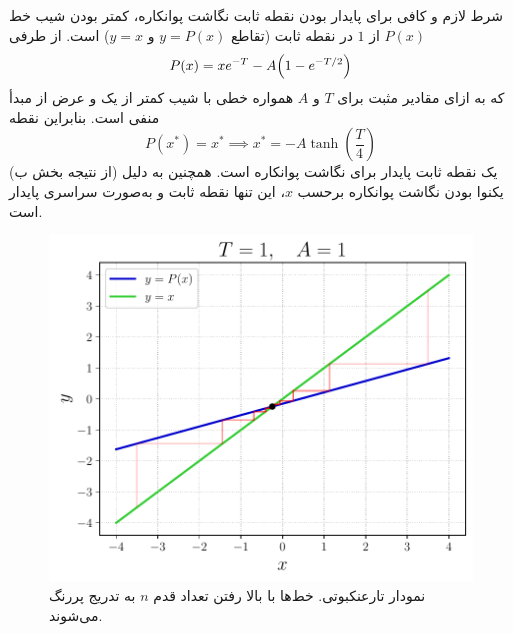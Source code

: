 \documentclass[12pt,a4paper]{article}
\begin{document}
	\subsection{}
	شرط لازم و کافی برای پایدار بودن نقطه ثابت نگاشت پوانکاره، کمتر بودن شیب خط $P(x)$ از $1$ در نقطه ثابت
	(تقاطع $y = P(x)$ و $y = x$) است. از طرفی
	\begin{equation}
		P(x) = xe^{-T} - A\qty(1-e^{-T/2})
	\end{equation}
	که به ازای مقادیر مثبت برای $T$ و $A$ همواره خطی با شیب کمتر از یک و عرض از مبدأ منفی است. بنابراین نقطه
	\begin{equation}
		P(x^*) = x^* \implies x^* = -A\tanh(\frac{T}{4})
	\end{equation}
	(از نتیجه بخش ب) یک نقطه ثابت پایدار برای نگاشت پوانکاره است. همچنین به دلیل یکنوا بودن نگاشت پوانکاره برحسب $x$،
	این تنها نقطه ثابت و به‌صورت سراسری پایدار است.
	\begin{figure}[h!]
		\centering
		\includegraphics[width=\linewidth]{fig/8.7.3}
		\caption{نمودار تارعنکبوتی. خط‌ها با بالا رفتن تعداد قدم $n$ به تدریج پررنگ می‌شوند.}
	\end{figure}
\end{document}
